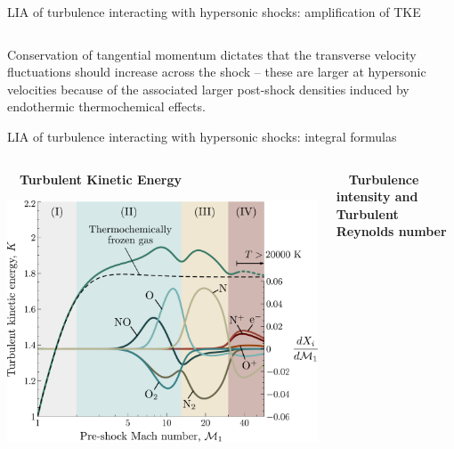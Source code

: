 \documentclass[9pt, aspectratio=1609]{beamer}
\begin{document}
\begin{frame}{\large LIA of turbulence interacting with hypersonic shocks: amplification of TKE}
\begin{columns}[c]
\begin{column}{.48\textwidth}
    \end{column}%
\end{columns}
\vspace{0.3cm}
Conservation of tangential momentum dictates that the transverse velocity fluctuations should increase across the shock -- these are larger at hypersonic velocities because of the associated larger post-shock densities induced by endothermic thermochemical effects.
\end{frame}
\begin{frame}{\large LIA of turbulence interacting with hypersonic shocks: integral formulas}
    \begin{columns}[c]
    \begin{column}{.4\textwidth}%
    \begin{center}
        \vspace{-0.3cm}\textbf{$\quad$Turbulent Kinetic Energy}\\ \vspace{0.3cm}
        
        \includegraphics[width=1.2\textwidth]{figures/aiaa2023/K3D_molarfraction_SFMC2022_labels.pdf}
    \end{center}
    \end{column}%
    \begin{column}{.45\textwidth}
    \begin{center}
        \vspace{-0.3cm}\textbf{$\quad$Turbulence intensity and Turbulent Reynolds number}\\ \vspace{0.3cm}
        

\end{center}
\end{column}
\end{columns}
\end{frame}
\end{document}

